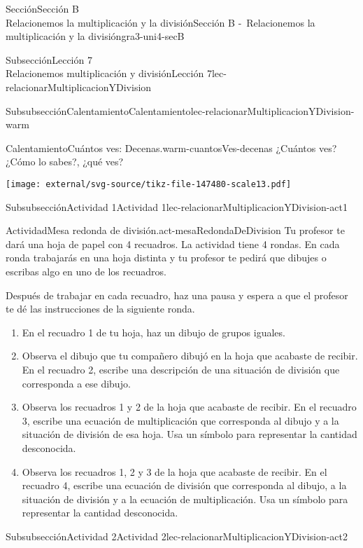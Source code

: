 \begin{sectionptx}{Sección}{{\Large Sección B\\}Relacionemos la multiplicación y la división}{}{Sección B -~Relacionemos la multiplicación y la división}{}{}{gra3-uni4-secB}
\begin{subsectionptx}{Subsección}{{\normalsize Lección 7\\[-0.05cm]}Relacionemos multiplicación y división}{}{Lección 7}{}{}{lec-relacionarMultiplicacionYDivision}
\begin{subsubsectionptx}{Subsubsección}{Calentamiento}{}{Calentamiento}{}{}{lec-relacionarMultiplicacionYDivision-warm}
\begin{exploration}{Calentamiento}{Cuántos ves: Decenas.}{warm-cuantosVes-decenas}
¿Cuántos ves?\\
 ¿Cómo lo sabes?, ¿qué ves?%
\begin{image}{0}{1}{0}{}%
\texttt{[image: external/svg-source/tikz-file-147480-scale13.pdf]}
\end{image}%
\end{exploration}%
\end{subsubsectionptx}
%
%
\typeout{************************************************}
\typeout{************************************************}
%
\begin{subsubsectionptx}{Subsubsección}{Actividad 1}{}{Actividad 1}{}{}{lec-relacionarMultiplicacionYDivision-act1}
\begin{activity}{Actividad}{Mesa redonda de división.}{act-mesaRedondaDeDivision}%
Tu profesor te dará una hoja de papel con 4 recuadros. La actividad tiene 4 rondas. En cada ronda trabajarás en una hoja distinta y tu profesor te pedirá que dibujes o escribas algo en uno de los recuadros.%
\par
Después de trabajar en cada recuadro, haz una pausa y espera a que el profesor te dé las instrucciones de la siguiente ronda.%
%
\begin{enumerate}
\item{}En el recuadro 1 de tu hoja, haz un dibujo de grupos iguales.%
\item{}Observa el dibujo que tu compañero dibujó en la hoja que acabaste de recibir. En el recuadro 2, escribe una descripción de una situación de división que corresponda a ese dibujo.%
\item{}Observa los recuadros 1 y 2 de la hoja que acabaste de recibir. En el recuadro 3, escribe una ecuación de multiplicación que corresponda al dibujo y a la situación de división de esa hoja. Usa un símbolo para representar la cantidad desconocida.%
\item{}Observa los recuadros 1, 2 y 3 de la hoja que acabaste de recibir. En el recuadro 4, escribe una ecuación de división que corresponda al dibujo, a la situación de división y a la ecuación de multiplicación. Usa un símbolo para representar la cantidad desconocida.%
\end{enumerate}
\end{activity}%
\end{subsubsectionptx}
%
%
\typeout{************************************************}
\typeout{************************************************}
%
\clearpage
\begin{subsubsectionptx}{Subsubsección}{Actividad 2}{}{Actividad 2}{}{}{lec-relacionarMultiplicacionYDivision-act2}

\end{subsubsectionptx}
\end{subsectionptx}
\end{sectionptx}
